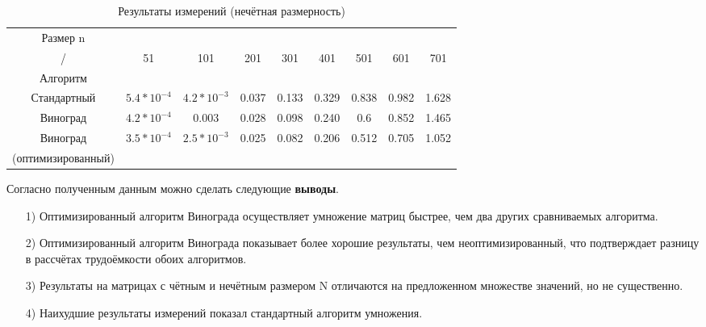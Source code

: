 \begin{table}[ph] \label{table_4_2}
	\caption{Результаты измерений (нечётная размерность)}
	\centering
	\begin{tabular}{|c|c|c|c|c|c|c|c|c|}
		\hline
		Размер n&&&&&&&&\\
		/    & 51 &101 & 201 & 301 & 401 & 501 & 601 & 701\\
		Алгоритм    &&&&&&&&\\
		\hline
		Стандартный & $5.4*10^{-4}$ & $4.2*10^{-3}$ & 0.037 & 0.133 & 0.329 & 0.838 & 0.982 & 1.628\\
		\hline
		Виноград & $4.2*10^{-4}$ & $0.003$ & 0.028 & 0.098 & 0.240 & 0.6 & 0.852 & 1.465\\
		\hline
		Виноград & $3.5*10^{-4}$ & $2.5*10^{-3}$ & 0.025 & 0.082 & 0.206 & 0.512 & 0.705 & 1.052\\
		(оптимизированный) &&&&&&&&\\
		\hline
	\end{tabular}
\end{table}

Согласно полученным данным можно сделать следующие \textbf{выводы}.
\begin{itemize}
	\item[1)]Оптимизированный алгоритм Винограда осуществляет умножение матриц быстрее, чем два других сравниваемых алгоритма.
	\item[2)]Оптимизированный алгоритм Винограда показывает более хорошие результаты, чем неоптимизированный, что подтверждает разницу в рассчётах трудоёмкости обоих алгоритмов.
	\item[3)]Результаты на матрицах с чётным и нечётным размером N отличаются на предложенном множестве значений, но не существенно.
	\item[4)]Наихудшие результаты измерений показал стандартный алгоритм умножения.
	\end{itemize}